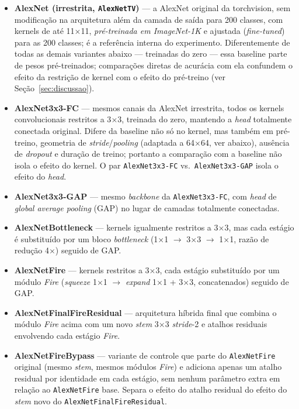 \documentclass[conference]{IEEEtran}
\begin{document}
\begin{itemize}
\item \textbf{AlexNet (irrestrita, \texttt{AlexNetTV})} — a AlexNet original da torchvision, sem
modificação na arquitetura além da camada de saída para 200 classes, com kernels de até
11$\times$11, \emph{pré-treinada em ImageNet-1K} e ajustada (\textit{fine-tuned}) para as 200
classes; é a referência interna do experimento. Diferentemente de todas as demais variantes
abaixo — treinadas do zero — essa baseline parte de pesos pré-treinados; comparações diretas de
acurácia com ela confundem o efeito da restrição de kernel com o efeito do pré-treino (ver
Seção~\ref{sec:discussao}).
\item \textbf{AlexNet3x3-FC} — mesmos canais da AlexNet irrestrita, todos os kernels
convolucionais restritos a 3$\times$3, treinada do zero, mantendo a \textit{head} totalmente
conectada original. Difere da baseline não só no kernel, mas também em pré-treino, geometria de
\textit{stride}/\textit{pooling} (adaptada a 64$\times$64, ver abaixo), ausência de \textit{dropout}
e duração de treino; portanto a comparação com a baseline não isola o efeito do kernel. O par \texttt{AlexNet3x3-FC}
vs.\ \texttt{AlexNet3x3-GAP} isola o efeito do \textit{head}.
\item \textbf{AlexNet3x3-GAP} — mesmo \textit{backbone} da \texttt{AlexNet3x3-FC}, com \textit{head}
de \textit{global average pooling} (GAP) \cite{lin2014network} no lugar de camadas totalmente
conectadas.
\item \textbf{AlexNetBottleneck} — kernels igualmente restritos a 3$\times$3, mas cada estágio é
substituído por um bloco \textit{bottleneck} (1$\times$1 $\rightarrow$ 3$\times$3 $\rightarrow$
1$\times$1, razão de redução 4$\times$) seguido de GAP.
\item \textbf{AlexNetFire} — kernels restritos a 3$\times$3, cada estágio substituído por um
módulo \textit{Fire} \cite{iandola2016squeezenet} (\textit{squeeze} 1$\times$1 $\rightarrow$
\textit{expand} 1$\times$1 + 3$\times$3, concatenados) seguido de GAP.
\item \textbf{AlexNetFinalFireResidual} — arquitetura híbrida final que combina o módulo
\textit{Fire} acima com um novo \textit{stem} 3$\times$3 \textit{stride}-2 e atalhos residuais
envolvendo cada estágio \textit{Fire}.
\item \textbf{AlexNetFireBypass} — variante de controle que parte do \texttt{AlexNetFire}
original (mesmo \textit{stem}, mesmos módulos \textit{Fire}) e adiciona apenas um atalho residual
por identidade em cada estágio, sem nenhum parâmetro extra em relação ao \texttt{AlexNetFire} base.
Separa o efeito do atalho residual do efeito do \textit{stem} novo do
\texttt{AlexNetFinalFireResidual}.
\end{itemize}
\end{document}
